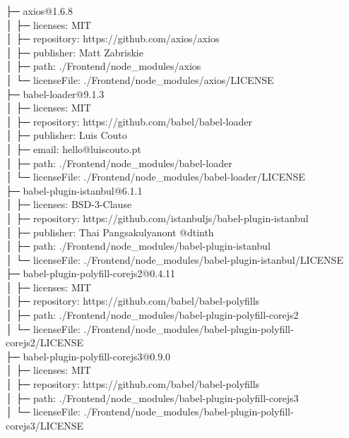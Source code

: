 \documentclass[
    paper=a4,
    twoside=false,
    parskip=half,
    listof=entryprefix,
    listof=totoc,
    index=totoc,
    bibliography=totoc,
    headsepline,
]{scrbook}
\begin{document}
    ├─ axios@1.6.8\\
    │  ├─ licenses: MIT\\
    │  ├─ repository: https://github.com/axios/axios\\
    │  ├─ publisher: Matt Zabriskie\\
    │  ├─ path: ./Frontend/node\_modules/axios\\
    │  └─ licenseFile: ./Frontend/node\_modules/axios/LICENSE\\
    ├─ babel-loader@9.1.3\\
    │  ├─ licenses: MIT\\
    │  ├─ repository: https://github.com/babel/babel-loader\\
    │  ├─ publisher: Luis Couto\\
    │  ├─ email: hello@luiscouto.pt\\
    │  ├─ path: ./Frontend/node\_modules/babel-loader\\
    │  └─ licenseFile: ./Frontend/node\_modules/babel-loader/LICENSE\\
    ├─ babel-plugin-istanbul@6.1.1\\
    │  ├─ licenses: BSD-3-Clause\\
    │  ├─ repository: https://github.com/istanbuljs/babel-plugin-istanbul\\
    │  ├─ publisher: Thai Pangsakulyanont @dtinth\\
    │  ├─ path: ./Frontend/node\_modules/babel-plugin-istanbul\\
    │  └─ licenseFile: ./Frontend/node\_modules/babel-plugin-istanbul/LICENSE\\
    ├─ babel-plugin-polyfill-corejs2@0.4.11\\
    │  ├─ licenses: MIT\\
    │  ├─ repository: https://github.com/babel/babel-polyfills\\
    │  ├─ path: ./Frontend/node\_modules/babel-plugin-polyfill-corejs2\\
    │  └─ licenseFile: ./Frontend/node\_modules/babel-plugin-polyfill-corejs2/LICENSE\\
    ├─ babel-plugin-polyfill-corejs3@0.9.0\\
    │  ├─ licenses: MIT\\
    │  ├─ repository: https://github.com/babel/babel-polyfills\\
    │  ├─ path: ./Frontend/node\_modules/babel-plugin-polyfill-corejs3\\
    │  └─ licenseFile: ./Frontend/node\_modules/babel-plugin-polyfill-corejs3/LICENSE\\
\end{document}
